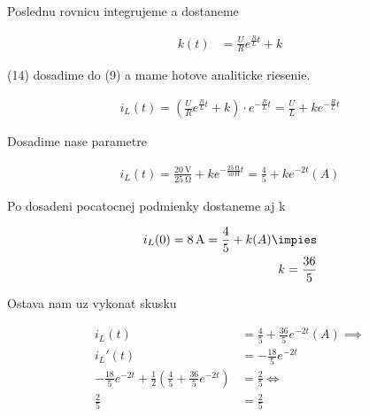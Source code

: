 Poslednu rovnicu integrujeme a dostaneme

\begin{align}
    k(t) &= \frac{U}{R} e^{\frac{R}{L}t} + k
\end{align}

(14) dosadime do (9) a mame hotove analiticke riesenie.

\begin{align}
    i_L(t) = (\frac{U}{R} e^{\frac{R}{L}t} + k) \cdot e^{-\frac{R}{L}t} = \frac{U}{L} + k e^{-\frac{R}{L}t}
\end{align}

Dosadime nase parametre

\begin{align}
    i_L(t) = \frac{\SI{20}{\volt}}{\SI{25}{\ohm}} + k e^{-\frac{\SI{25}{\ohm}}{\SI{50}{\henry}}t} = \frac{4}{5} + ke^{-2t}(A)
\end{align}

Po dosadeni pocatocnej podmienky dostaneme aj k

\begin{align}
    i_L(0) = \SI{8}{\ampere} = \frac{4}{5} + k(A) \impies \\
    k = \frac{36}{5}
\end{align}

Ostava nam uz vykonat skusku

\begin{align}
    i_L(t) &= \frac{4}{5} + \frac{36}{5}e^{-2t} (A) \implies\\
    i_L'(t) &= -\frac{18}{5}e^{-2t}
    \\
    -\frac{18}{5}e^{-2t} +  \frac{1}{2}(\frac{4}{5} + \frac{36}{5}e^{-2t})  &= \frac{2}{5} \iff\\
    \frac{2}{5} &= \frac{2}{5}
\end{align}